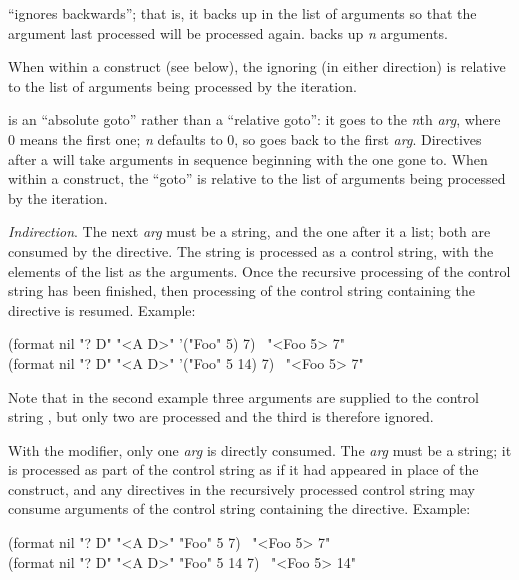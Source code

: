 \begin{flushdesc}
\cd{{\Xtilde}:*} ``ignores backwards''; that is, it backs up in the list of
arguments so that the argument last processed will be processed again.
 backs up {\it n} arguments.

When within a \cd{{\Xtilde}{\Xlbrace}} construct
(see below), the ignoring (in either direction) is relative to the list
of arguments being processed by the iteration.

 is an ``absolute goto'' rather than a ``relative goto'':
it goes to the {\it n}th {\it arg}, where 0 means the first one;
{\it n} defaults to 0, so \cd{{\Xtilde}{\Xatsign}*} goes back to the first {\it arg}.
Directives after a 
will take arguments in sequence beginning with the one gone to.
When within a \cd{{\Xtilde}{\Xlbrace}} construct, the ``goto''
is relative to the list of arguments being processed by the iteration.

\item[\cd{{\Xtilde}?}]
{\it Indirection}.
The next {\it arg} must be a string, and the one after it a list;
both are consumed by the  directive.
The string is processed as a  control string, with the
elements of the list as the arguments.  Once the recursive processing
of the control string has been finished, then processing of the control
string containing the  directive is resumed.
Example:
\begin{lisp}
(format nil "{\Xtilde}? {\Xtilde}D" "<{\Xtilde}A {\Xtilde}D>" '("Foo" 5) 7) \EV\ "<Foo 5> 7" \\
(format nil "{\Xtilde}? {\Xtilde}D" "<{\Xtilde}A {\Xtilde}D>" '("Foo" 5 14) 7) \EV\ "<Foo 5> 7"
\end{lisp}
Note that in the second example three arguments are supplied
to the control string , but only two are processed
and the third is therefore ignored.

With the \cd{{\Xatsign}} modifier, only one {\it arg} is directly consumed.
The {\it arg} must be a string; it is processed as part of the control
string as if it had appeared in place of the  construct,
and any directives in the recursively processed control string may
consume arguments of the control string containing the 
directive.
Example:
\begin{lisp}
(format nil "{\Xtilde}{\Xatsign}? {\Xtilde}D" "<{\Xtilde}A {\Xtilde}D>" "Foo" 5 7) \EV\ "<Foo 5> 7" \\
(format nil "{\Xtilde}{\Xatsign}? {\Xtilde}D" "<{\Xtilde}A {\Xtilde}D>" "Foo" 5 14 7) \EV\ "<Foo 5> 14"
\end{lisp}


\end{flushdesc}
